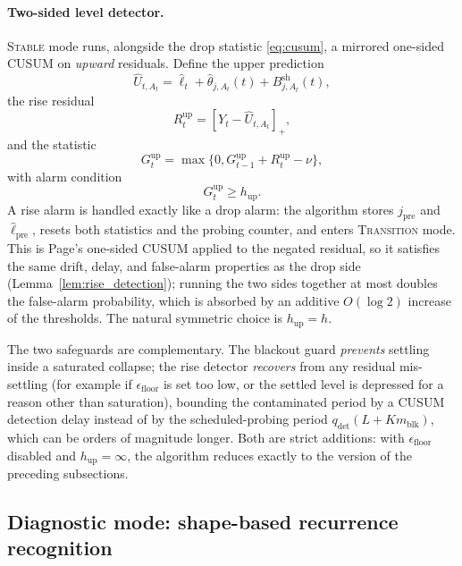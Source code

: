 \documentclass[11pt]{article}
\newcommand{\pos}[1]{\left[#1\right]_{+}}
\begin{document}
\paragraph{Two-sided level detector.}
\textsc{Stable} mode runs, alongside the drop statistic \eqref{eq:cusum}, a mirrored one-sided CUSUM on \emph{upward} residuals. Define the upper prediction
\begin{equation}
\label{eq:upper_prediction}
\widehat U_{t,A_t}
=
\widehat\ell_t+
\widehat\theta_{j,A_t}(t)+B_{j,A_t}^{\mathrm{sh}}(t),
\end{equation}
the rise residual
\begin{equation}
\label{eq:rise_residual}
R_t^{\mathrm{up}}
=
\pos{Y_t-\widehat U_{t,A_t}},
\end{equation}
and the statistic
\begin{equation}
\label{eq:cusum_up}
G_t^{\mathrm{up}}
=
\max\{0,G_{t-1}^{\mathrm{up}}+R_t^{\mathrm{up}}-\nu\},
\end{equation}
with alarm condition
\begin{equation}
\label{eq:rise_alarm}
G_t^{\mathrm{up}}\geq h_{\mathrm{up}}.
\end{equation}
A rise alarm is handled exactly like a drop alarm: the algorithm stores $j_{\mathrm{pre}}$ and $\widehat\ell_{\mathrm{pre}}$, resets both statistics and the probing counter, and enters \textsc{Transition} mode. This is Page's one-sided CUSUM applied to the negated residual, so it satisfies the same drift, delay, and false-alarm properties as the drop side (Lemma~\ref{lem:rise_detection}); running the two sides together at most doubles the false-alarm probability, which is absorbed by an additive $O(\log 2)$ increase of the thresholds. The natural symmetric choice is $h_{\mathrm{up}}=h$.

The two safeguards are complementary. The blackout guard \emph{prevents} settling inside a saturated collapse; the rise detector \emph{recovers} from any residual mis-settling (for example if $\epsilon_{\mathrm{floor}}$ is set too low, or the settled level is depressed for a reason other than saturation), bounding the contaminated period by a CUSUM detection delay instead of by the scheduled-probing period $q_{\mathrm{det}}(L+Km_{\mathrm{blk}})$, which can be orders of magnitude longer. Both are strict additions: with $\epsilon_{\mathrm{floor}}$ disabled and $h_{\mathrm{up}}=\infty$, the algorithm reduces exactly to the version of the preceding subsections.

\subsection{Diagnostic mode: shape-based recurrence recognition}
\label{subsec:diagnostic_mode}
\end{document}
